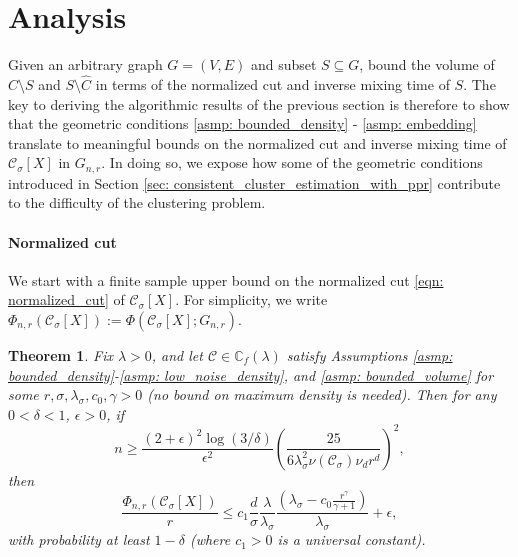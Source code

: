 \documentclass{article}
\newcommand{\1}{\mathbf{1}}
\newcommand{\Xbf}{X}             %
\newcommand{\Cbb}{\mathbb{C}}
\newcommand{\Cset}{\mathcal{C}}
\newcommand{\Csig}{\Cset_{\sigma}}
\newcommand{\Cest}{\widehat{C}}
\theoremstyle{aldenthm}
\newtheorem{theorem}{Theorem}
\theoremstyle{aldenrmrk}
\begin{document}
\section{Analysis}
\label{sec: analysis}

Given an arbitrary graph $G = (V,E)$ and subset $S \subseteq G$, \citet{zhu2013} bound the volume of $\Cest \setminus S$ and $S \setminus \Cest$ in terms of the normalized cut and inverse mixing time of $S$. The key to deriving the algorithmic results of the previous section is therefore to show that the geometric conditions \ref{asmp: bounded_density} - \ref{asmp: embedding} translate to meaningful bounds on the normalized cut and inverse mixing time of $\Csig[\Xbf]$ in $G_{n,r}$. In doing so, we expose how some of the geometric conditions introduced in Section \ref{sec: consistent_cluster_estimation_with_ppr} contribute to the difficulty of the clustering problem.

\paragraph{Normalized cut} We start with a finite sample upper bound on the normalized cut \eqref{eqn: normalized_cut} of 
$\Cset_\sigma[\Xbf]$. For simplicity, we write $\Phi_{n,r}(\Csig[\Xbf]) := \Phi(\Csig[\Xbf]; G_{n,r})$.

\begin{theorem}
	\label{thm: conductance_upper_bound}
	Fix $\lambda > 0$, and let $\Cset \in \Cbb_f(\lambda)$ satisfy
	Assumptions \ref{asmp: bounded_density}-\ref{asmp: low_noise_density}, and \ref{asmp: bounded_volume} for some 
	$r, \sigma, \lambda_{\sigma}, c_0, \gamma > 0$ (no bound on maximum density is needed). 
	Then for any $0 < \delta < 1$, $\epsilon > 0$, if
	\begin{equation}
	\label{eqn: conductance_sample_complexity}
	n \geq \frac{(2+\epsilon)^2\log(3/\delta)}{\epsilon^2}\left(\frac{25}
	{6 \lambda_{\sigma}^2\nu(\Csig) \nu_d r^d}\right)^2,
	\end{equation}
	then
	\begin{equation}
	\label{eqn: conductance_additive_error_bound}
	\frac{\Phi_{n,r}(\Csig[\Xbf])}{r} \leq c_1 \frac{d}{\sigma}
	\frac{\lambda}{\lambda_{\sigma}} \frac{(\lambda_{\sigma} -
		c_0\frac{r^{\gamma}}{\gamma+1})}{\lambda_{\sigma}} + \epsilon, 
	\end{equation}
	with probability at least $1-\delta$ (where $c_1 > 0$ is a universal constant).
\end{theorem}
\end{document}
